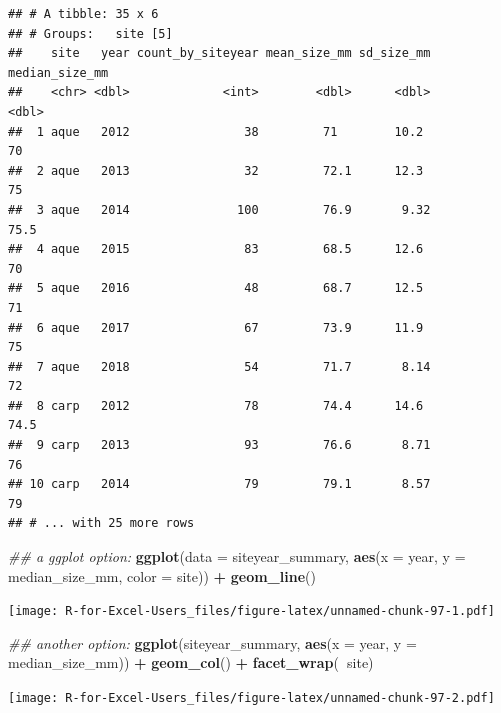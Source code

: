 \documentclass[]{book}
\newenvironment{Shaded}{\begin{snugshade}}{\end{snugshade}}
\newcommand{\CommentTok}[1]{\textcolor[rgb]{0.56,0.35,0.01}{\textit{#1}}}
\newcommand{\DataTypeTok}[1]{\textcolor[rgb]{0.13,0.29,0.53}{#1}}
\newcommand{\KeywordTok}[1]{\textcolor[rgb]{0.13,0.29,0.53}{\textbf{#1}}}
\newcommand{\NormalTok}[1]{#1}
\newcommand{\OperatorTok}[1]{\textcolor[rgb]{0.81,0.36,0.00}{\textbf{#1}}}
\newcommand{\StringTok}[1]{\textcolor[rgb]{0.31,0.60,0.02}{#1}}
\begin{document}
\begin{verbatim}
## # A tibble: 35 x 6
## # Groups:   site [5]
##    site   year count_by_siteyear mean_size_mm sd_size_mm median_size_mm
##    <chr> <dbl>             <int>        <dbl>      <dbl>          <dbl>
##  1 aque   2012                38         71        10.2            70  
##  2 aque   2013                32         72.1      12.3            75  
##  3 aque   2014               100         76.9       9.32           75.5
##  4 aque   2015                83         68.5      12.6            70  
##  5 aque   2016                48         68.7      12.5            71  
##  6 aque   2017                67         73.9      11.9            75  
##  7 aque   2018                54         71.7       8.14           72  
##  8 carp   2012                78         74.4      14.6            74.5
##  9 carp   2013                93         76.6       8.71           76  
## 10 carp   2014                79         79.1       8.57           79  
## # ... with 25 more rows
\end{verbatim}

\begin{Shaded}
\begin{Highlighting}[]
\CommentTok{## a ggplot option:}
\KeywordTok{ggplot}\NormalTok{(}\DataTypeTok{data =}\NormalTok{ siteyear_summary, }\KeywordTok{aes}\NormalTok{(}\DataTypeTok{x =}\NormalTok{ year, }\DataTypeTok{y =}\NormalTok{ median_size_mm, }\DataTypeTok{color =}\NormalTok{ site)) }\OperatorTok{+}
\StringTok{  }\KeywordTok{geom_line}\NormalTok{() }
\end{Highlighting}
\end{Shaded}

\texttt{[image: R-for-Excel-Users\_files/figure-latex/unnamed-chunk-97-1.pdf]}

\begin{Shaded}
\begin{Highlighting}[]
\CommentTok{## another option:}
\KeywordTok{ggplot}\NormalTok{(siteyear_summary, }\KeywordTok{aes}\NormalTok{(}\DataTypeTok{x =}\NormalTok{ year, }\DataTypeTok{y =}\NormalTok{ median_size_mm)) }\OperatorTok{+}
\StringTok{  }\KeywordTok{geom_col}\NormalTok{() }\OperatorTok{+}
\StringTok{  }\KeywordTok{facet_wrap}\NormalTok{(}\OperatorTok{~}\NormalTok{site)}
\end{Highlighting}
\end{Shaded}

\texttt{[image: R-for-Excel-Users\_files/figure-latex/unnamed-chunk-97-2.pdf]}
\end{document}
